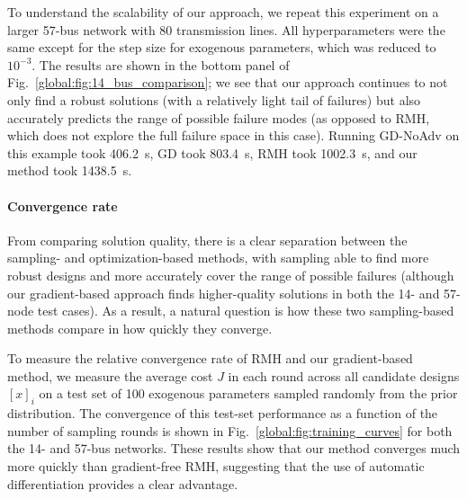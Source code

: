 To understand the scalability of our approach, we repeat this experiment on a larger 57-bus network with 80 transmission lines. All hyperparameters were the same except for the step size for exogenous parameters, which was reduced to $10^{-3}$. The results are shown in the bottom panel of Fig.~\ref{global:fig:14_bus_comparison}; we see that our approach continues to not only find a robust solutions (with a relatively light tail of failures) but also accurately predicts the range of possible failure modes (as opposed to RMH, which does not explore the full failure space in this case). Running GD-NoAdv on this example took \SI{406.2}{s}, GD took \SI{803.4}{s}, RMH took \SI{1002.3}{s}, and our method took \SI{1438.5}{s}.

\paragraph{Convergence rate} From comparing solution quality, there is a clear separation between the sampling- and optimization-based methods, with sampling able to find more robust designs and more accurately cover the range of possible failures (although our gradient-based approach finds higher-quality solutions in both the 14- and 57-node test cases). As a result, a natural question is how these two sampling-based methods compare in how quickly they converge.

To measure the relative convergence rate of RMH and our gradient-based method, we measure the average cost $J$ in each round across all candidate designs $[x]_i$ on a test set of 100 exogenous parameters sampled randomly from the prior distribution. The convergence of this test-set performance as a function of the number of sampling rounds is shown in Fig.~\ref{global:fig:training_curves} for both the 14- and 57-bus networks. These results show that our method converges much more quickly than gradient-free RMH, suggesting that the use of automatic differentiation provides a clear advantage.

